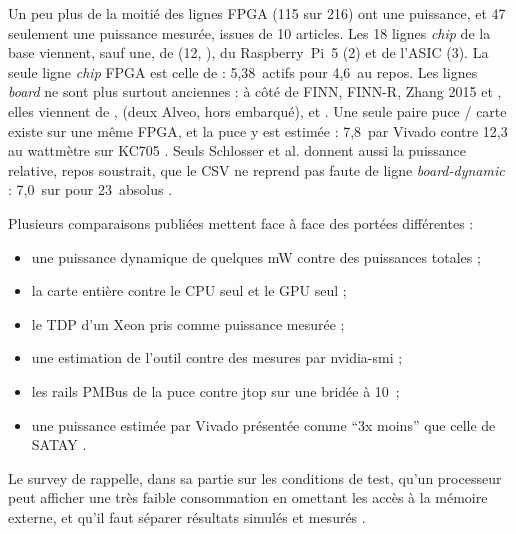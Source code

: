 Un peu plus de la moitié des lignes FPGA (115 sur 216) ont une puissance, et 47
seulement une puissance mesurée, issues de 10 articles. Les 18 lignes \emph{chip} de la base viennent,
sauf une, de  (12, \citealp{arxiv-2502.15737-performance-analysis-you-only-look}),
du Raspberry~Pi~5 (2) et de l'ASIC  (3). La seule ligne \emph{chip} FPGA est celle de
\citet[§IV-B]{arxiv-2407.17647-energy-efficient-artefact-detection-accelerator} : 5,38\,
actifs pour 4,6\, au repos. Les lignes \emph{board} ne sont plus surtout anciennes : à
côté de FINN, FINN-R, Zhang 2015 et , elles viennent de
\citet{2024-zhang-end-end-acceleration-yolo-object},
\citet{2021-alonso-elastic-df-scaling-performance-dnn} (deux Alveo, hors embarqué),
\citet{arxiv-2304.11580-framework-benchmarking-real-time-embedded} et
\citet{arxiv-2609.24757-npu-accelerator-quantized-real-time}\pp. Une seule paire puce /
carte existe sur une même FPGA, et la puce y est estimée : 7,8\, par Vivado contre
12,3\, au wattmètre sur KC705 \citep[Table~3]{2024-zhang-end-end-acceleration-yolo-object}.
Seuls Schlosser et al. donnent aussi la puissance relative, repos soustrait, que le CSV
ne reprend pas faute de ligne \emph{board-dynamic} : 7,0\, sur  pour 23\, absolus
.

Plusieurs comparaisons publiées mettent face à face des portées différentes :
\begin{itemize}
  \item une puissance dynamique de quelques mW contre des puissances totales
    \citep[Table~16]{2019-coutinho-deep-neural-network-hardware-implementation} ;
  \item la carte entière contre le CPU seul et le GPU seul
    \citep[§6.4]{2019-tsukada-neural-network-device-learning-anomaly} ;
  \item le TDP d'un Xeon pris comme puissance mesurée
    \citep[§5.2]{2015-zhang-optimizing-fpga-accelerator-design-deep} ;
  \item une estimation de l'outil contre des mesures par nvidia-smi
    \citep[§VII-D]{arxiv-2604.21280-imagehd-energy-efficient-device-continual} ;
  \item les rails PMBus de la puce contre jtop sur une  bridée à 10\,
    \citep[Table~VI]{arxiv-2407.17647-energy-efficient-artefact-detection-accelerator} ;
  \item une puissance estimée par Vivado présentée comme \enquote{3x moins} que celle de
    SATAY \citep[Résumé, Table~III]{arxiv-2607.13106-no-attention-no-problem-dpu}\pp.
\end{itemize}
Le survey de \citet{2023-shuvo-efficient-acceleration-deep-learning-inference} rappelle,
dans sa partie sur les conditions de test, qu'un processeur peut afficher une très faible
consommation en omettant les accès à la mémoire externe, et qu'il faut séparer résultats
simulés et mesurés .

